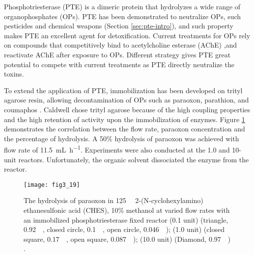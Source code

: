 \begin{refsection}
Phosphotriesterase (PTE) is a dimeric protein that hydrolyzes a wide range of
organophosphates (OPs). PTE has been demonstrated to neutralize OPs, such
pesticides and chemical weapons (Section \ref{sec:pte-intro}), and such
property makes PTE an excellent agent for detoxification. Current treatments
for OPs rely on compounds that competitively bind to acetylcholine esterase
(AChE) ,and reactivate AChE after exposure to OPs. Different strategy gives PTE
great potential to compete with current treatments as PTE directly neutralize
the toxins. 

To extend the application of PTE, immobilization has been developed on trityl
agarose resin, allowing decontamination of OPs such as paraoxon, parathion, and
coumaphos \cite{Caldwell1991}. Caldwell  chose trityl agarose
because of the high coupling properties and the high retention of activity upon
the immobilization of enzymes. Figure \ref{fig:pte-app-imm} demonstrates the
correlation between the flow rate, paraoxon concentration and the percentage of
hydrolysis. A 50\% hydrolysis of paraoxon was achieved with flow rate of
\SI{11.5}{\mL\per\hour}. Experiments were also conducted at the 1.0 and 10-unit
reactors. Unfortunately, the organic solvent dissociated the enzyme from the
reactor.
\begin{figure}[htbp] \centering \texttt{[image: fig3\_19]}
    \caption[The hydrolysis of paraoxon in \SI{125}{\milli\Molar}
        2-(N-cyclohexylamino)ethanesulfonic acid (CHES), 10\% methanol at
    varied flow rates with an immobilized phosphotriesterase fixed reactor (0.1
unit) (triangle, \SI{0.92}{\milli\Molar}, closed circle,
\SI{0.1}{\milli\Molar}, open circle, \SI{0.046}{\milli\Molar}); (1.0 unit)
(closed square, \SI{0.17}{\milli\Molar}, open square,
\SI{0.087}{\milli\Molar}); (10.0 unit) (Diamond, \SI{0.97}{\milli\Molar}).]{The
    hydrolysis of paraoxon in \SI{125}{\milli\Molar} 2-(N-cyclohexylamino)
    ethanesulfonic acid (CHES), 10\% methanol at varied flow rates with an
    immobilized phosphotriesterase fixed reactor (0.1 unit) (triangle,
    \SI{0.92}{\milli\Molar}, closed circle, \SI{0.1}{\milli\Molar}, open
    circle, \SI{0.046}{\milli\Molar}); (1.0 unit) (closed square,
    \SI{0.17}{\milli\Molar}, open square, \SI{0.087}{\milli\Molar}); (10.0
    unit) (Diamond, \SI{0.97}{\milli\Molar}) \cite{Caldwell1991}.}
    \label{fig:pte-app-imm}
\end{figure}


\end{refsection}
